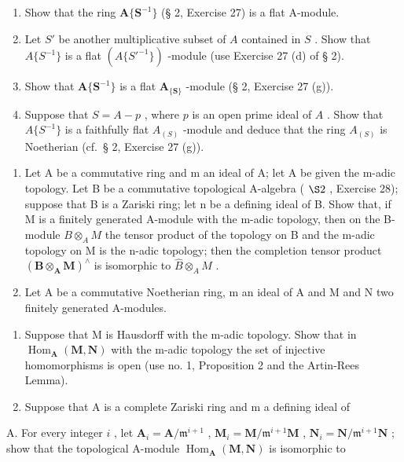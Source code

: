 \begin{enumerate}
\def\labelenumi{(\alph{enumi})}
\item
  Show that the ring \(\mathbf{A}\{\mathbf{S}^{-1}\}\) (§ 2, Exercise 27) is a flat A-module.
\item
  Let \(S'\) be another multiplicative subset of \(A\) contained in \(S\) . Show that \(A\{S^{-1}\}\) is a flat \((A\{S'^{-1}\})\) -module (use Exercise 27 (d) of § 2).
\item
  Show that \(\mathbf{A}\{\mathbf{S}^{-1}\}\) is a flat \(\mathbf{A}_{\{\mathbf{S}\}}\) -module (§ 2, Exercise 27 (g)).
\item
  Suppose that \(S = A - p\) , where \(p\) is an open prime ideal of \(A\) . Show that \(A\{S^{-1}\}\) is a faithfully flat \(A_{(S)}\) -module and deduce that the ring \(A_{(S)}\) is Noetherian (cf.~§ 2, Exercise 27 (g)).
\end{enumerate}

\begin{enumerate}
\def\labelenumi{\arabic{enumi}.}
\setcounter{enumi}{19}
\item
  Let A be a commutative ring and m an ideal of A; let A be given the m-adic topology. Let B be a commutative topological A-algebra ( \(\S 2\) , Exercise 28); suppose that B is a Zariski ring; let n be a defining ideal of B. Show that, if M is a finitely generated A-module with the m-adic topology, then on the B-module \(B \otimes_{A} M\) the tensor product of the topology on B and the m-adic topology on M is the n-adic topology; then the completion tensor product \((\mathbf{B} \otimes_{\mathbf{A}} \mathbf{M})^{\wedge}\) is isomorphic to \(\hat{B} \otimes_{A} M\) .
\item
  Let A be a commutative Noetherian ring, m an ideal of A and M and N two finitely generated A-modules.
\end{enumerate}

\begin{enumerate}
\def\labelenumi{(\alph{enumi})}
\item
  Suppose that M is Hausdorff with the m-adic topology. Show that in \(\operatorname{Hom}_{\mathbf{A}}(\mathbf{M}, \mathbf{N})\) with the m-adic topology the set of injective homomorphisms is open (use no. 1, Proposition 2 and the Artin-Rees Lemma).
\item
  Suppose that A is a complete Zariski ring and m a defining ideal of
\end{enumerate}

A. For every integer \(i\) , let \(\mathbf{A}_i = \mathbf{A} / \mathfrak{m}^{i+1}\) , \(\mathbf{M}_i = \mathbf{M} / \mathfrak{m}^{i+1}\mathbf{M}\) , \(\mathbf{N}_i = \mathbf{N} / \mathfrak{m}^{i+1}\mathbf{N}\) ; show that the topological A-module \(\operatorname{Hom}_{\mathbf{A}}(\mathbf{M}, \mathbf{N})\) is isomorphic to

